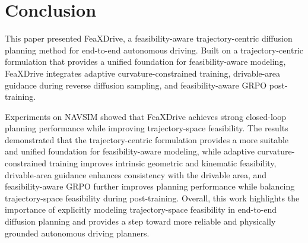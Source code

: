 \documentclass[3p,times,authoryear]{elsarticle}
\begin{document}
\section{Conclusion}

This paper presented FeaXDrive, a feasibility-aware trajectory-centric diffusion planning method for end-to-end autonomous driving. Built on a trajectory-centric formulation that provides a unified foundation for feasibility-aware modeling, FeaXDrive integrates adaptive curvature-constrained training, drivable-area guidance during reverse diffusion sampling, and feasibility-aware GRPO post-training.

Experiments on NAVSIM showed that FeaXDrive achieves strong closed-loop planning performance while improving trajectory-space feasibility. The results demonstrated that the trajectory-centric formulation provides a more suitable and unified foundation for feasibility-aware modeling, while adaptive curvature-constrained training improves intrinsic geometric and kinematic feasibility, drivable-area guidance enhances consistency with the drivable area, and feasibility-aware GRPO further improves planning performance while balancing trajectory-space feasibility during post-training. Overall, this work highlights the importance of explicitly modeling trajectory-space feasibility in end-to-end diffusion planning and provides a step toward more reliable and physically grounded autonomous driving planners.



\end{document}
